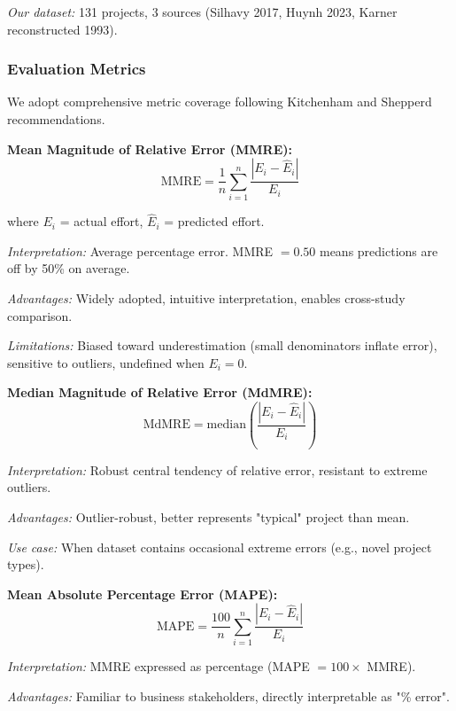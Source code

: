 \documentclass[11pt,a4paper]{article}
\begin{document}
\textit{Our dataset:} 131 projects, 3 sources (Silhavy 2017, Huynh 2023, Karner reconstructed 1993).

\subsubsection{Evaluation Metrics}
\label{sec:metrics}

We adopt comprehensive metric coverage following Kitchenham and Shepperd recommendations.

\textbf{Mean Magnitude of Relative Error (MMRE):}
\begin{equation}
\text{MMRE} = \frac{1}{n}\sum_{i=1}^{n}\frac{|E_i - \hat{E}_i|}{E_i}
\label{eq:mmre}
\end{equation}

where $E_i$ = actual effort, $\hat{E}_i$ = predicted effort.

\textit{Interpretation:} Average percentage error. MMRE $= 0.50$ means predictions are off by 50\% on average.

\textit{Advantages:} Widely adopted, intuitive interpretation, enables cross-study comparison.

\textit{Limitations:} Biased toward underestimation (small denominators inflate error), sensitive to outliers, undefined when $E_i = 0$.

\textbf{Median Magnitude of Relative Error (MdMRE):}
\begin{equation}
\text{MdMRE} = \text{median}\left(\frac{|E_i - \hat{E}_i|}{E_i}\right)
\label{eq:mdmre}
\end{equation}

\textit{Interpretation:} Robust central tendency of relative error, resistant to extreme outliers.

\textit{Advantages:} Outlier-robust, better represents "typical" project than mean.

\textit{Use case:} When dataset contains occasional extreme errors (e.g., novel project types).

\textbf{Mean Absolute Percentage Error (MAPE):}
\begin{equation}
\text{MAPE} = \frac{100}{n}\sum_{i=1}^{n}\frac{|E_i - \hat{E}_i|}{E_i}
\label{eq:mape}
\end{equation}

\textit{Interpretation:} MMRE expressed as percentage (MAPE $= 100 \times$ MMRE).

\textit{Advantages:} Familiar to business stakeholders, directly interpretable as "\% error".
\end{document}
